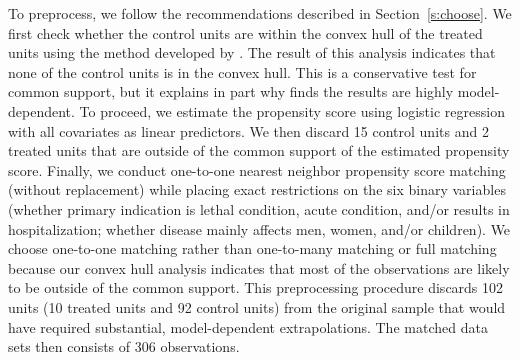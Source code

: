 \documentclass[11pt,titlepage]{article}
\begin{document}
To preprocess, we follow the recommendations described in
Section~\ref{s:choose}. We first check whether the control units are
within the convex hull of the treated units using the method developed
by \citet{KinZen06b}.  The result of this analysis indicates that none
of the control units is in the convex hull.  This is a conservative
test for common support, but it explains in part why
\citet{Carpenter02} finds the results are highly model-dependent. To
proceed, we estimate the propensity score using logistic regression
with all covariates as linear predictors.  We then discard 15 control
units and 2 treated units that are outside of the common support of
the estimated propensity score.  Finally, we conduct one-to-one
nearest neighbor propensity score matching (without replacement) while
placing exact restrictions on the six binary variables (whether
primary indication is lethal condition, acute condition, and/or
results in hospitalization; whether disease mainly affects men, women,
and/or children). We choose one-to-one matching rather than
one-to-many matching or full matching because our convex hull analysis
indicates that most of the observations are likely to be outside of
the common support.  This preprocessing procedure discards 102 units
(10 treated units and 92 control units) from the original sample that
would have required substantial, model-dependent extrapolations. The
matched data sets then consists of 306 observations.
\end{document}
